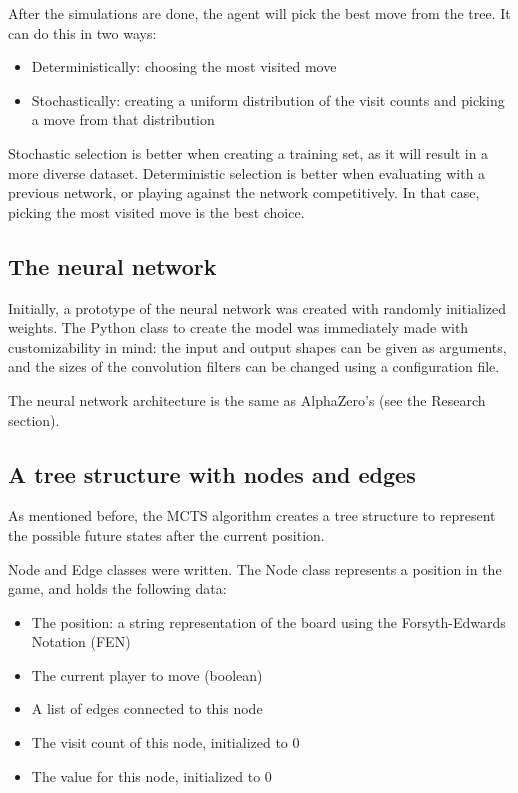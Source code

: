 \documentclass{article}
\begin{document}
After the simulations are done, the agent will pick the best move from the tree. 
It can do this in two ways:

\begin{itemize}
    \item Deterministically: choosing the most visited move 
    \item Stochastically: creating a uniform distribution of the visit counts and picking a move from that distribution
\end{itemize}

Stochastic selection is better when creating a training set, as it will result in a more diverse dataset.
Deterministic selection is better when evaluating with a previous network, or playing against the network competitively. 
In that case, picking the most visited move is the best choice.


\subsection{The neural network}

Initially, a prototype of the neural network was created with randomly initialized weights.
The Python class to create the model was immediately made with customizability in mind: 
the input and output shapes can be given as arguments, and the sizes of the convolution filters 
can be changed using a configuration file.

The neural network architecture is the same as AlphaZero's (see the Research section). 

\subsection{A tree structure with nodes and edges}

As mentioned before, the MCTS algorithm creates a tree structure to represent 
the possible future states after the current position.

Node and Edge classes were written. The Node class represents a position in the game, and
holds the following data:

\begin{itemize}
    \item The position: a string representation of the board using the Forsyth-Edwards Notation (FEN) \cite{ForsythEdwardsNotation2022}
    \item The current player to move (boolean)
    \item A list of edges connected to this node
    \item The visit count of this node, initialized to 0
    \item The value for this node, initialized to 0
\end{itemize}
\end{document}
